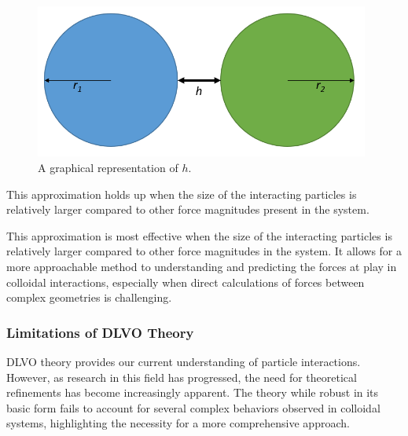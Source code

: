 \begin{figure}[h]     %
        \begin{center}
          \includegraphics[width=110mm]{chapter1/h_graph.PNG}
\end{center}
\caption{A graphical representation of $h$.}
\label{fig:h_graph}                 %
\end{figure}

This approximation holds up when the size of the interacting particles is relatively larger compared to other force magnitudes present in the system. 

This approximation is most effective when the size of the interacting particles is relatively larger compared to other force magnitudes in the system. It allows for a more approachable method to understanding and predicting the forces at play in colloidal interactions, especially when direct calculations of forces between complex geometries is challenging.\cite{DLVOsmolOverview, smolBook1, Origin2V, IsGreenBook}\cite{surfpattQ, Surfquestion}





%

\subsubsection{Limitations of DLVO Theory}

DLVO theory provides our current understanding of particle interactions. However, as research in this field has progressed, the need for theoretical refinements has become increasingly apparent. The theory while robust in its basic form fails to account for several complex behaviors observed in colloidal systems, highlighting the necessity for a more comprehensive approach.

